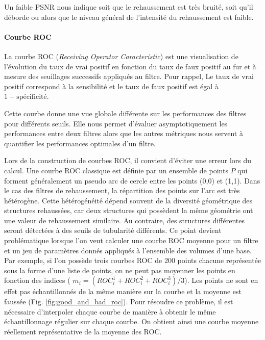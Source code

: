 Un faible PSNR nous indique soit que le rehaussement est très bruité, soit qu'il déborde ou alors que le niveau général de l'intensité du rehaussement est faible.


\paragraph{Courbe ROC}

La courbe ROC (\textit{Receiving Operator Caracteristic}) est une visualisation de l'évolution du taux de vrai positif en fonction du taux de faux positif au fur et à mesure des seuillages successifs appliqués au filtre. Pour rappel, Le taux de vrai positif correspond à la sensibilité et le taux de faux positif est égal à $1-\text{spécificité}$. 

Cette courbe donne une vue globale différente sur les performances des filtres pour différents seuils. Elle nous permet d'évaluer asymptotiquement les performances entre deux filtres alors que les autres métriques nous servent à quantifier les performances optimales d'un filtre. 

Lors de la construction de courbes ROC, il convient d'éviter une erreur lors du calcul. Une courbe ROC classique est définie par un ensemble de points $P$ qui forment généralement un pseudo arc de cercle entre les points (0,0) et (1,1). Dans le cas des filtres de rehaussement, la répartition des points sur l'arc est très hétérogène. Cette hétérogénéité dépend souvent de la diversité géométrique des structures rehaussées, car deux structures qui possèdent la même géométrie ont une valeur de rehaussement similaire. Au contraire, des structures différentes seront détectées à des seuils de tubularité différents. Ce point devient problématique lorsque l'on veut calculer une courbe ROC moyenne pour un filtre et un jeu de paramètres donnés appliqués à l'ensemble des volumes d'une base. Par exemple, si l'on possède trois courbes ROC de 200 points chacune représentée sous la forme d'une liste de points, on ne peut pas moyenner les points en fonction des indices ( $m_i = (ROC^1_{i} + ROC^2_{i} + ROC^3_{i})/3 $). Les points ne sont en effet pas échantillonnés de la même manière sur la courbe et la moyenne est faussée (Fig. \ref{fig:good_and_bad_roc}). Pour résoudre ce problème, il est nécessaire d'interpoler chaque courbe de manière à obtenir le même échantillonnage régulier sur chaque courbe. On obtient ainsi une courbe moyenne réellement représentative de la moyenne des ROC.

